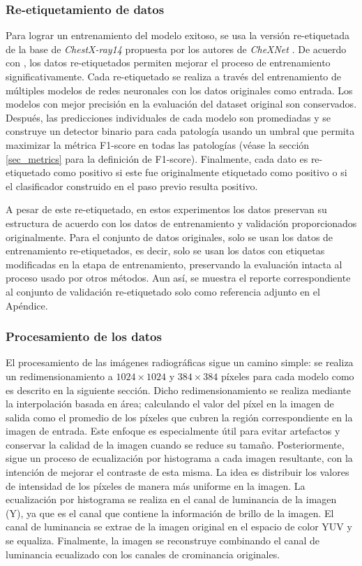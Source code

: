 \subsubsection{Re-etiquetamiento de datos}
\label{ssec_relabelling}

Para lograr un entrenamiento del modelo exitoso, se usa la versión re-etiquetada de la base de
\textit{ChestX-ray14} propuesta por los autores de \textit{CheXNet} \cite{rajpurkar2018deep}. De
acuerdo con \cite{rajpurkar2018deep}, los datos re-etiquetados permiten mejorar el proceso de
entrenamiento significativamente. Cada re-etiquetado se realiza a través del entrenamiento de
múltiples modelos de redes neuronales con los datos originales como entrada. Los modelos con mejor
precisión en la evaluación del dataset original son conservados. Después, las predicciones
individuales de cada modelo son promediadas y se construye un detector binario para cada patología
usando un umbral que permita maximizar la métrica F1-score en todas las patologías (véase la sección
\ref{sec_metrics} para la definición de F1-score). Finalmente, cada dato es re-etiquetado como
positivo si este fue originalmente etiquetado como positivo o si el clasificador construido en el
paso previo resulta positivo.

A pesar de este re-etiquetado, en estos experimentos los datos preservan su estructura de acuerdo
con los datos de entrenamiento y validación proporcionados originalmente. Para el conjunto de datos
originales, solo se usan los datos de entrenamiento re-etiquetados, es decir, solo se usan los datos
con etiquetas modificadas en la etapa de entrenamiento, preservando la evaluación intacta al proceso
usado por otros métodos. Aun así, se muestra el reporte correspondiente al conjunto de validación
re-etiquetado solo como referencia adjunto en el Apéndice.


\subsubsection{Procesamiento de los datos}

El procesamiento de las imágenes radiográficas sigue un camino simple: se realiza un redimensionamiento a
$1024 \times 1024$ y $384 \times 384$ píxeles para cada modelo como es descrito en la siguiente sección. Dicho
redimensionamiento se realiza mediante la interpolación basada en área; calculando el valor del píxel en la imagen de
salida como el promedio de los píxeles que cubren la región correspondiente en la imagen de entrada. Este enfoque es
especialmente útil para evitar artefactos y conservar la calidad de la imagen cuando se reduce su tamaño.
Posteriormente, sigue un proceso de ecualización por histograma a cada imagen resultante, con la intención de mejorar
el contraste de esta misma. La idea es distribuir los valores de intensidad de los píxeles de manera más uniforme en la
imagen. La ecualización por histograma se realiza en el canal de luminancia de la imagen (Y), ya que es el canal que
contiene la información de brillo de la imagen.
El canal de luminancia se extrae de la imagen original en el espacio de color YUV y se equaliza. Finalmente, la imagen
se reconstruye combinando el canal de luminancia ecualizado con los canales de crominancia originales.

